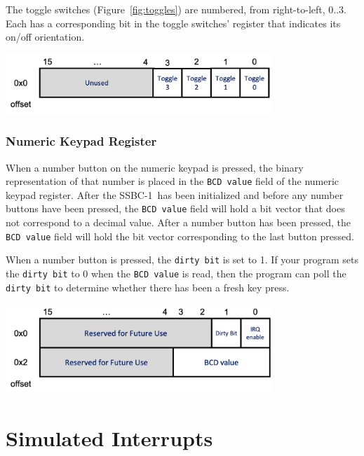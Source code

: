 \documentclass[12pt]{article}
\newcommand{\SSBC}{SSBC-1}
\begin{document}
The toggle switches (Figure~\ref{fig:toggles}) are numbered, from
right-to-left, $0..3$. Each has a corresponding bit in the toggle switches'
register that indicates its on/off orientation.

\begin{center}
\includegraphics[width=10cm]{toggle-register}
\end{center}

\subsubsection{Numeric Keypad Register} \label{sec:keypad}

When a number button on the numeric keypad is pressed, the binary
representation of that number is placed in the \texttt{BCD value} field of the
numeric keypad register. After the \SSBC\ has been initialized and before any
number buttons have been pressed, the \texttt{BCD value} field will hold a bit
vector that does not correspond to a decimal value. After a number button has
been pressed, the \texttt{BCD value} field will hold the bit vector
corresponding to the last button pressed.

When a number button is pressed, the \texttt{dirty bit} is set to 1. If your
program sets the \texttt{dirty bit} to 0 when the \texttt{BCD value} is read,
then the program can poll the \texttt{dirty bit} to determine whether there has
been a fresh key press.

\begin{center}
\includegraphics[width=10cm]{keypad-register}
\end{center}

\newpage \section{Simulated Interrupts} \label{sec:interrupts}
\end{document}
